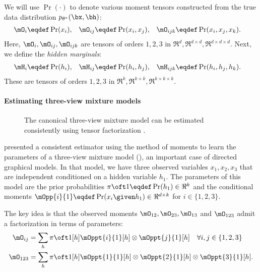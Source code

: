 We will use $\Pr(\cdot)$ to denote various moment tensors
constructed from the true data distribution $p_{\theta^*}(\bx,\bh)$:
\begin{align*}
  \mO_i &\eqdef \Pr(x_i), &
  \mO_{ij} &\eqdef \Pr(x_i, x_j), &
  \mO_{ijk} &\eqdef \Pr(x_i, x_j, x_k).
\end{align*}
Here, $\mO_i, \mO_{ij}, \mO_{ijk}$ are tensors of
  orders $1, 2, 3$ in $\Re^d, \Re^{d\times d}, \Re^{d \times d \times d}$.
Next, we define the \emph{hidden marginals}:
\begin{align*}
  \mH_i &\eqdef \Pr(h_i), &
  \mH_{ij} &\eqdef \Pr(h_i, h_j), &
  \mH_{ijk} &\eqdef \Pr(h_i, h_j, h_k).
\end{align*}
These are tensors of
  orders $1, 2, 3$ in $\Re^k, \Re^{k\times k}, \Re^{k \times k \times k}$.

\paragraph{Estimating three-view mixture models}

\begin{figure}[t]
  \label{fig:three-view}
  \centering
  
  \caption{The canonical three-view mixture model can be estimated consistently using tensor factorization \citep{anandkumar13tensor}.}
\end{figure}

\citet{anandkumar12moments} presented a consistent estimator
  using the method of moments to learn the parameters of a three-view
  mixture model (), an important case of directed
  graphical models. %
In that model, we have three observed variables $x_1, x_2, x_3$
  that are independent conditioned on a hidden variable $h_1$.  
The parameters of this model are the prior probabilities $\pi\oft 1 \eqdef
  \Pr(h_1) \in \Re^k$ and the conditional moments $\mOpp{i}{1} \eqdef
  \Pr(x_i \given h_1) \in \Re^{d \times k}$ for $i \in \{1,2,3\}$.

  The key idea is that the observed moments $\mO_{12}, \mO_{23}, \mO_{13}$ and
  $\mO_{123}$ admit a factorization in terms of parameters:
\begin{align*}
  \mO_{ij} &= \sum_h {\pi \oft 1}[h] {\mOppt{i}{1}}[h] \otimes {\mOppt{j}{1}}[h] \quad \forall i,j \in \{1,2,3\} \\
  \mO_{123} &= \sum_h {\pi \oft 1}[h] {\mOppt{1}{1}}[h] \otimes {\mOppt{2}{1}}[h] \otimes  {\mOppt{3}{1}}[h].
\end{align*}


